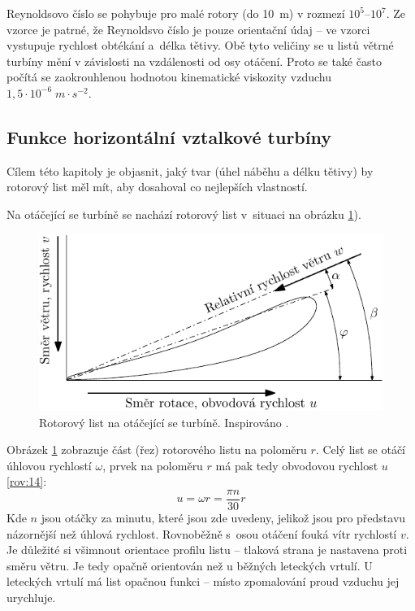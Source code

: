 	Reynoldsovo číslo se pohybuje pro malé rotory (do 10~m) v rozmezí $10^5$–$10^7$\cite{ve:ve}. Ze vzorce je patrné, že Reynoldsvo číslo je pouze orientační údaj – ve vzorci vystupuje rychlost obtékání a~délka tětivy. Obě tyto veličiny se u listů větrné turbíny mění v závislosti na vzdálenosti od osy otáčení. Proto se také často počítá se zaokrouhlenou hodnotou kinematické viskozity vzduchu $1,5\cdot 10^{-6}\;m\cdot s^{-2}$\cite{Rychetnik:Motory}.
	
	\subsection{Funkce horizontální vztalkové turbíny}\label{kap:funkce1}
	Cílem této kapitoly je objasnit, jaký tvar (úhel náběhu a délku tětivy) by rotorový list měl mít, aby dosahoval co nejlepších vlastností.
	
	Na otáčející se turbíně se nachází rotorový list v~situaci na obrázku \ref{obr.profilprostor}).
	
	\begin{figure}[H]
		\centering
		\includegraphics[]{obrazky/profilnavrtuli}
		\caption{Rotorový list na otáčející se turbíně. Inspirováno \cite{Rychetnik:Motory}.}
		\label{obr.profilprostor}
	\end{figure}
	Obrázek \ref{obr.profilprostor} zobrazuje část (řez) rotorového listu na poloměru $r$. Celý list se otáčí úhlovou rychlostí $\omega$, prvek na poloměru $r$ má pak tedy obvodovou rychlost $u$ \eqref{rov:14}\cite{Rychetnik:Motory}:
	\begin{equation}
		\label{rov:14}
		u=\omega r=\frac{\pi n}{30}r
	\end{equation}
	Kde $n$ jsou otáčky za minutu, které jsou zde uvedeny, jelikož jsou pro představu názornější než úhlová rychlost. Rovnoběžně s~osou otáčení fouká vítr rychlostí $v$. Je důležité si všimnout orientace profilu listu – tlaková strana je nastavena proti směru větru. Je tedy opačně orientován než u běžných leteckých vrtulí. U leteckých vrtulí má list opačnou funkci – místo zpomalování proud vzduchu jej urychluje.
	

